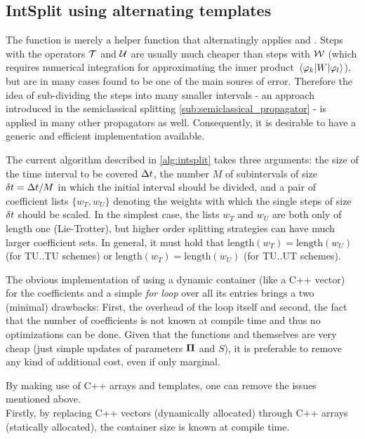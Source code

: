 \subsection{IntSplit using alternating templates}
\label{subsec:intsplit}
%
The  function is merely a helper function that alternatingly applies  and .
Steps with the operators $\mathcal{T}$ and $\mathcal{U}$ are usually much cheaper than steps with $\mathcal{W}$ (which requires numerical integration for approximating the inner product $\matrixel{\varphi_k}{W}{\varphi_l}$), but are in many cases found to be one of the main soures of error.
Therefore the idea of sub-dividing the steps into many smaller intervals - an approach introduced in the semiclassical splitting \ref{sub:semiclassical_propagator} - is applied in many other propagators as well.
Consequently, it is desirable to have a generic and efficient implementation available.
\par\medskip
%
The current  algorithm described in \ref{alg:intsplit} takes three arguments:
the size of the time interval to be covered $\Delta t$, the number $M$ of subintervals of size $\delta t = \Delta t/M$ in which the initial interval should be divided, and a pair of coefficient lists $\{ w_T, w_U \}$ denoting the weights with which the single steps of size $\delta t$ should be scaled.
In the simplest case, the lists $w_T$ and $w_U$ are both only of length one (Lie-Trotter), but higher order splitting strategies can have much larger coefficient sets.
In general, it must hold that $\text{length}(w_T) = \text{length}(w_U)$ (for TU..TU schemes) or $\text{length}(w_T) = \text{length}(w_U)$ (for TU..UT schemes).
\par\medskip
%
The obvious implementation of using a dynamic container (like a C++ vector) for the coefficients and a simple \emph{for loop} over all its entries brings a two (minimal) drawbacks: First, the overhead of the loop itself and second, the fact that the number of coefficients is not known at compile time and thus no optimizations can be done.
Given that the functions  and  themselves are very cheap (just simple updates of parameters $\bm{\Pi}$ and $S$), it is preferable to remove any kind of additional cost, even if only marginal.
\par\medskip
%
By making use of C++ arrays and templates, one can remove the issues mentioned above. \\
%
Firstly, by replacing C++ vectors (dynamically allocated) through C++ arrays (statically allocated), the container size is known at compile time.
